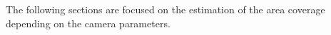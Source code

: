 

The following sections are focused on the estimation of the area coverage  depending on the camera parameters.\\






